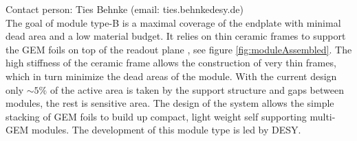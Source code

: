 \label{chap:TPC_sec:DESY_gems}
Contact person: Ties Behnke (email: ties.behnke\@ desy.de)\\

The goal of module type-B is a maximal coverage of the endplate with minimal dead area and a low material budget. It relies on thin ceramic frames to support the GEM foils on top of the readout plane \cite{Hallermann:2010zz,2012arXiv1202.6510D}, see figure \ref{fig:moduleAssembled}. The high stiffness of the ceramic frame allows the construction of very thin frames, which in turn minimize the dead areas of the module. With the current design only $\sim5\%$ of the active area is taken by the support structure and gaps between modules, the rest is sensitive area. The design of the system allows the simple stacking of GEM foils to build up compact, light weight self supporting multi-GEM modules. The development of this module type is led by DESY.

